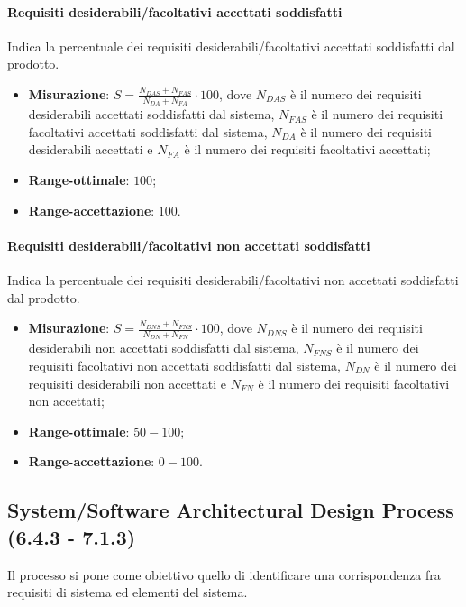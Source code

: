 \paragraph{Requisiti desiderabili/facoltativi accettati soddisfatti}
\label{reqAccSodd}
Indica la percentuale dei requisiti desiderabili/facoltativi accettati soddisfatti dal prodotto.
\begin{itemize}
\item \textbf{Misurazione}: $S=\frac{N_{DAS}+N_{FAS}}{N_{DA}+N_{FA}} \cdot 100$, dove $N_{DAS}$ è il numero dei requisiti desiderabili accettati soddisfatti dal sistema, $N_{FAS}$ è il numero dei requisiti facoltativi accettati soddisfatti dal sistema, $N_{DA}$ è il numero dei requisiti desiderabili accettati e $N_{FA}$ è il numero dei requisiti facoltativi accettati;
\item \textbf{Range-ottimale}: $100$;
\item \textbf{Range-accettazione}: $100$.
\end{itemize}
\paragraph{Requisiti desiderabili/facoltativi non accettati soddisfatti}
\label{reqNonAccSodd}
Indica la percentuale dei requisiti desiderabili/facoltativi non accettati soddisfatti dal prodotto.
\begin{itemize}
\item \textbf{Misurazione}: $S=\frac{N_{DNS}+N_{FNS}}{N_{DN}+N_{FN}} \cdot 100$, dove $N_{DNS}$ è il numero dei requisiti desiderabili non accettati soddisfatti dal sistema, $N_{FNS}$ è il numero dei requisiti facoltativi non accettati soddisfatti dal sistema, $N_{DN}$ è il numero dei requisiti desiderabili non accettati e $N_{FN}$ è il numero dei requisiti facoltativi non accettati;
\item \textbf{Range-ottimale}: $50 - 100$;
\item \textbf{Range-accettazione}: $0 - 100$.
\end{itemize}

\subsection{System/Software Architectural Design Process (6.4.3 - 7.1.3)}
\label{sySoArchiDesign}
Il processo si pone come obiettivo quello di identificare una corrispondenza fra requisiti di sistema ed elementi del sistema.
